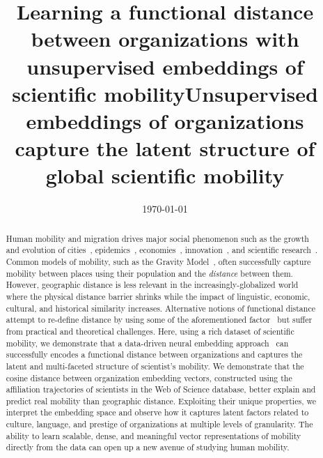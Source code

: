 \documentclass[12pt]{article} %
\begin{document}
\title{Learning a functional distance between organizations with unsupervised embeddings of scientific mobility}
\title{Unsupervised embeddings of organizations capture the latent structure of global scientific mobility} %
\date{\today}
\maketitle %

%
%

\begin{abstract}


Human mobility and migration drives major social phenomenon such as the growth and evolution of cities~\autocite{wef2017migration, curiel2018citygravity},  epidemics~\autocite{kraemer2020covid, truscott2012epidemicgravity, xia2005measlesgravity}, economies~\autocite{kaluza2010cargo, kerr2011immigration}, innovation~\autocite{kaiser2018innovation, armano2017innovation},  and scientific research~\autocite{sugimoto2017mostimpact, petersen2018multiscale, franzoni2014advantage, morgan2018prestige, rodrigues2016mobility}. 
Common models of mobility, such as the Gravity Model~\autocite{zipf1946gravity, xia2005measlesgravity, jung2008highwaygravity, barbosa2018human, curiel2018citygravity, lewer2008immigrationgravity, hong2016busgravity, truscott2012epidemicgravity, xia2005measlesgravity}, often successfully capture mobility between places using their population and the \textit{distance} between them.
However, geographic distance is less relevant in the increasingly-globalized world~\autocite{czaika2018migration, czaika2018globalisation, buchan2009globalization} where the physical distance barrier shrinks while the impact of linguistic, economic, cultural, and historical similarity increases.
Alternative notions of functional distance~\autocite{brown1970migration, brown1970functional, kim2018functional} attempt to re-define distance by using some of the aforementioned factor~\autocite{boschma2005proximity,  brown1970functional, brown1970migration, kim2018functional} but suffer from practical and theoretical challenges. 
Here, using a rich dataset of scientific mobility, we demonstrate that a data-driven neural embedding approach~\autocite{mikolov2013word2vec} can successfully encodes a functional distance between organizations and captures the latent and multi-faceted structure of scientist's mobility.
We demonstrate that the cosine distance between organization embedding vectors, constructed using the affiliation trajectories of scientists in the Web of Science database, better explain and predict real mobility than geographic distance. 
Exploiting their unique properties, we interpret the embedding space and observe how it captures latent factors related to culture, language, and prestige of organizations at multiple levels of granularity.
The ability to learn scalable, dense, and meaningful vector representations of mobility directly from the data can open up a new avenue of studying human mobility.

\end{abstract}
\end{document}
